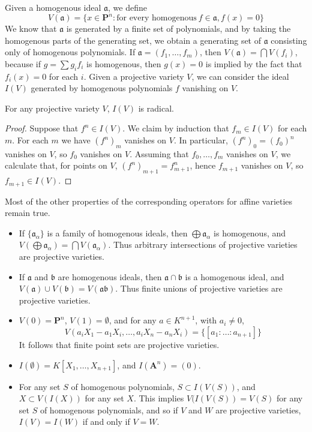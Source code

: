 Given a homogenous ideal $\mathfrak{a}$, we define
%
\[ V(\mathfrak{a}) = \{ x \in \mathbf{P}^n: \text{for every homogenous}\ f \in \mathfrak{a}, f(x) = 0 \} \]
%
We know that $\mathfrak{a}$ is generated by a finite set of polynomials, and by taking the homogenous parts of the generating set, we obtain a generating set of $\mathfrak{a}$ consisting only of homogenous polynomials. If $\mathfrak{a} = (f_1, \dots, f_m)$, then $V(\mathfrak{a}) = \bigcap V(f_i)$, because if $g = \sum g_i f_i$ is homogenous, then $g(x) = 0$ is implied by the fact that $f_i(x) = 0$ for each $i$. Given a projective variety $V$, we can consider the ideal $I(V)$ generated by homogenous polynomials $f$ vanishing on $V$.

\begin{theorem}
    For any projective variety $V$, $I(V)$ is radical.
\end{theorem}
\begin{proof}
    Suppose that $f^n \in I(V)$. We claim by induction that $f_m \in I(V)$ for each $m$. For each $m$ we have $(f^n)_m$ vanishes on $V$. In particular, $(f^n)_0 = (f_0)^n$ vanishes on $V$, so $f_0$ vanishes on $V$. Assuming that $f_0, \dots, f_m$ vanishes on $V$, we calculate that, for points on $V$, $(f^n)_{m+1} = f_{m+1}^n$, hence $f_{m+1}$ vanishes on $V$, so $f_{m+1} \in I(V)$.
\end{proof}

Most of the other properties of the corresponding operators for affine varieties remain true.
%
\begin{itemize}
    \item If $\{ \mathfrak{a}_\alpha \}$ is a family of homogenous ideals, then $\bigoplus \mathfrak{a}_\alpha$ is homogenous, and $V(\bigoplus \mathfrak{a}_\alpha) = \bigcap V(\mathfrak{a}_\alpha)$. Thus arbitrary intersections of projective varieties are projective varieties.

    \item If $\mathfrak{a}$ and $\mathfrak{b}$ are homogenous ideals, then $\mathfrak{a} \cap \mathfrak{b}$ is a homogenous ideal, and $V(\mathfrak{a}) \cup V(\mathfrak{b}) = V(\mathfrak{a}\mathfrak{b})$. Thus finite unions of projective varieties are projective varieties.

    \item $V(0) = \mathbf{P}^n$, $V(1) = \emptyset$, and for any $a \in K^{n+1}$, with $a_i \neq 0$,
    \[ V(a_iX_1 - a_1X_i, \dots, a_iX_n - a_nX_i) = \{ [a_1:\dots:a_{n+1}] \} \]
    It follows that finite point sets are projective varieties.

    \item $I(\emptyset) = K[X_1, \dots, X_{n+1}]$, and $I(\mathbf{A}^n) = (0)$.

    \item For any set $S$ of homogenous polynomials, $S \subset I(V(S))$, and $X \subset V(I(X))$ for any set $X$. This implies $V(I(V(S)) = V(S)$ for any set $S$ of homogenous polynomials, and so if $V$ and $W$ are projective varieties, $I(V) = I(W)$ if and only if $V = W$.
\end{itemize}

